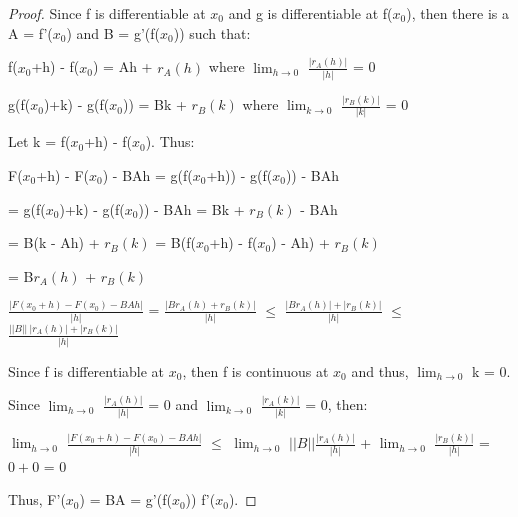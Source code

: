    \begin{proof}
        Since f is differentiable at $x_0$ and g is differentiable at f($x_0$),
        then there is a A = f'($x_0$) and B = g'(f($x_0$)) such that:

        \hspace{0.5cm}
        f($x_0$+h) - f($x_0$)
        = Ah + $r_A(h)$
        \hspace{2cm}
        where $\lim_{h \rightarrow 0}$ $\frac{|r_A(h)|}{|h|}$ = 0

        \hspace{0.5cm}
        g(f($x_0$)+k) - g(f($x_0$))
        = Bk + $r_B(k)$
        \hspace{1cm}
        where $\lim_{k \rightarrow 0}$ $\frac{|r_B(k)|}{|k|}$ = 0

        Let k = f($x_0$+h) - f($x_0$). Thus:

        \hspace{0.5cm}
        F($x_0$+h) - F($x_0$) - BAh
        = g(f($x_0$+h)) - g(f($x_0$)) - BAh

        \hspace{4.8cm}
        = g(f($x_0$)+k) - g(f($x_0$)) - BAh
        = Bk + $r_B(k)$ - BAh

        \hspace{4.8cm}
        = B(k - Ah) + $r_B(k)$
        = B(f($x_0$+h) - f($x_0$) - Ah) + $r_B(k)$

        \hspace{4.8cm}
        = B$r_A(h)$ + $r_B(k)$

        \hspace{0.5cm}
        $\frac{|F(x_0+h) - F(x_0) - BAh|}{|h|}$
        = $\frac{|Br_A(h) + r_B(k)|}{|h|}$
        $\leq$ $\frac{|Br_A(h)| + |r_B(k)|}{|h|}$
        $\leq$ $\frac{||B|| \ |r_A(h)| + |r_B(k)|}{|h|}$

        Since f is differentiable at $x_0$, then f is continuous at $x_0$
        and thus, $\lim_{h \rightarrow 0}$ k = 0.

        Since $\lim_{h \rightarrow 0}$ $\frac{|r_A(h)|}{|h|}$ = 0
        and $\lim_{k \rightarrow 0}$ $\frac{|r_A(k)|}{|k|}$ = 0, then:

        \hspace{0.5cm}
        $\lim_{h \rightarrow 0}$ $\frac{|F(x_0+h) - F(x_0) - BAh|}{|h|}$
        $\leq$ $\lim_{h \rightarrow 0}$ $||B|| \frac{|r_A(h)|}{|h|}$
                + $\lim_{h \rightarrow 0}$ $\frac{|r_B(k)|}{|h|}$
        = $0+0$ = 0

        Thus, F'($x_0$) = BA = g'(f($x_0$)) f'($x_0$).
    \end{proof}

